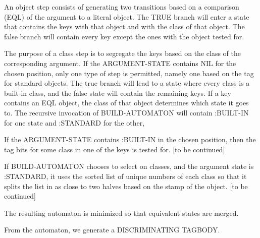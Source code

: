 An object step consists of generating two transitions based on a
comparison (EQL) of the argument to a literal object.  The TRUE branch
will enter a state that contains the keys with that object and with
the class of that object.  The false branch will contain every key
except the ones with the object tested for.

The purpose of a class step is to segregate the keys based on the
class of the corresponding argument.  If the ARGUMENT-STATE contains
NIL for the chosen position, only one type of step is permitted,
namely one based on the tag for standard objects.  The true branch
will lead to a state where every class is a built-in class, and the
false state will contain the remaining keys. If a key contains an
EQL object, the class of that object determines which state it goes
to.  The recursive invocation of BUILD-AUTOMATON will contain
:BUILT-IN for one state and :STANDARD for the other, 

If the ARGUMENT-STATE contains :BUILT-IN in the chosen position, then
the tag bits for some class in one of the keys is tested for. [to be
continued] 

If BUILD-AUTOMATON chooses to select on classes, and the argument
state is :STANDARD, it uses the sorted list of unique numbers of each
class so that it splits the list in as close to two halves based on
the stamp of the object. [to be continued]

The resulting automaton is minimized so that equivalent states are
merged.

From the automaton, we generate a DISCRIMINATING TAGBODY.
